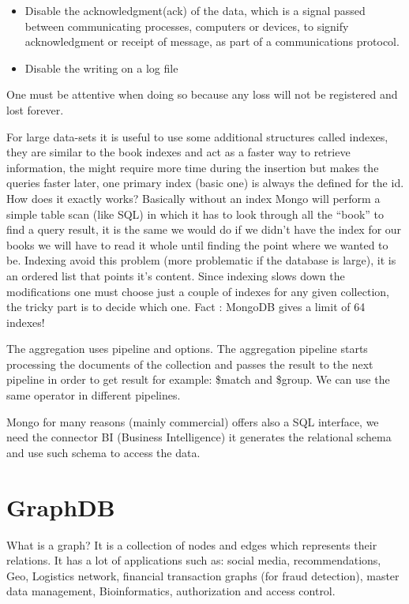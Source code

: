 \documentclass[a4page, 11pt]{article}
\begin{document}
\begin{itemize}[noitemsep]
	 
	\item
	Disable the acknowledgment(ack) of the data, which is a signal passed between communicating processes, computers or devices, to signify acknowledgment or receipt of message, as part of a communications
	protocol.
	\item
	Disable the writing on a log file
\end{itemize}

One must be attentive when doing so because any loss will not be registered and lost forever.

For large data-sets it is useful to use some additional structures called indexes, they are similar to the book indexes and act as a faster way to retrieve information, the might require more time during the insertion but makes the queries faster later, one primary index (basic one) is always the defined for the id. How does it exactly works?
Basically without an index Mongo will perform a simple table scan (like SQL) in which it has to look through all the ``book'' to find a query result, it is the same we would do if we didn't have the index for our books we will have to read it whole until finding the point where we
wanted to be. Indexing avoid this problem (more problematic if the database is large), it is an ordered list that points it's content.
Since indexing slows down the modifications one must choose just a couple of indexes for any given collection, the tricky part is to decide which one. Fact : MongoDB gives a limit of 64 indexes!

The aggregation uses pipeline and options. 
The aggregation pipeline starts processing the documents of the collection and passes the result to the next pipeline in order to get result for example: \$match and \$group. 
We can use the same operator in different pipelines.

Mongo for many reasons (mainly commercial) offers also a SQL interface, we need the connector BI (Business Intelligence) it generates the relational schema and use such schema to access the data.

\section{GraphDB}

What is a graph? It is a collection of nodes and edges which represents their relations. 
It has a lot of applications such as: social media, recommendations, Geo, Logistics network, financial transaction graphs (for fraud detection), master data management, Bioinformatics, authorization and access control.
\end{document}
